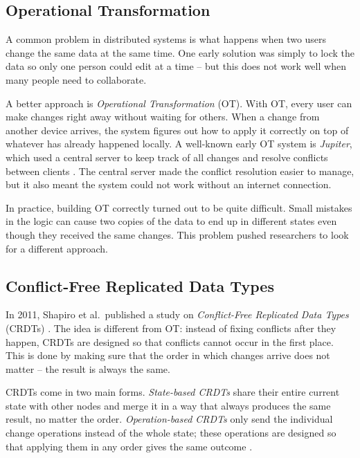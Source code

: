 \subsection{Operational Transformation}

A common problem in distributed systems is what happens when two users change the same data at the same time.
One early solution was simply to lock the data so only one person could edit at a time -- but this does not
work well when many people need to collaborate.

A better approach is \textit{Operational Transformation} (OT). With OT, every user can make changes right
away without waiting for others. When a change from another device arrives, the system figures out how to
apply it correctly on top of whatever has already happened locally. A well-known early OT system is
\textit{Jupiter}, which used a central server to keep track of all changes and resolve conflicts between
clients \cite{nichols1995jupiter}. The central server made the conflict resolution easier to manage, but it
also meant the system could not work without an internet connection.

In practice, building OT correctly turned out to be quite difficult. Small mistakes in the logic can cause
two copies of the data to end up in different states even though they received the same changes. This problem
pushed researchers to look for a different approach.

\subsection{Conflict-Free Replicated Data Types}

In 2011, Shapiro et al.\ published a study on \textit{Conflict-Free Replicated Data Types} (CRDTs)
\cite{shapiro2011comprehensive}. The idea is different from OT: instead of fixing conflicts after they
happen, CRDTs are designed so that conflicts cannot occur in the first place. This is done by making sure
that the order in which changes arrive does not matter -- the result is always the same.

CRDTs come in two main forms. \textit{State-based CRDTs} share their entire current state with other nodes
and merge it in a way that always produces the same result, no matter the order. \textit{Operation-based
CRDTs} only send the individual change operations instead of the whole state; these operations are designed
so that applying them in any order gives the same outcome \cite{shapiro2011comprehensive}.

